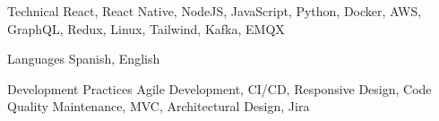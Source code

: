 
\begin{cvskills}

  \cvskill
  {Technical} %
  {React, React Native, NodeJS, JavaScript, Python, Docker, AWS, GraphQL, Redux, Linux, Tailwind, Kafka, EMQX} %

  \cvskill
  {Languages} %
  {Spanish, English} %

  \cvskill
  {Development Practices} %
  {Agile Development, CI/CD, Responsive Design, Code Quality Maintenance, MVC, Architectural Design, Jira} %

\end{cvskills}
